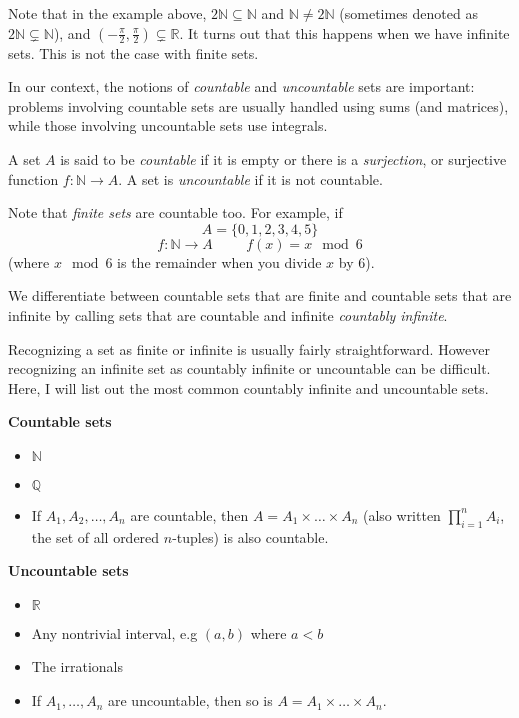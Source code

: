 \begin{appendices}
    Note that in the example above, $2\mathbb{N} \subseteq \mathbb{N}$ and $\mathbb{N} \neq 2 \mathbb{N}$ (sometimes denoted as $2\mathbb{N} \varsubsetneq \mathbb{N}$), and $(-\frac{\pi}{2}, \frac{\pi}{2}) \varsubsetneq \mathbb{R}$. It turns out that this happens when we have infinite sets. This is not the case with finite sets.

    In our context, the notions of \textit{countable} and \textit{uncountable} sets are important: problems involving countable sets are usually handled using sums (and matrices), while those involving uncountable sets use integrals.

    \begin{defn}
        A set $A$ is said to be \textit{countable} if it is empty or there is a \textit{surjection}, or surjective function $f: \mathbb{N} \rightarrow A$. A set is \textit{uncountable} if it is not countable.
    \end{defn}
    Note that \textit{finite sets} are countable too. For example, if 
    \[
    A = \{0,1,2,3,4,5\}
    \]
    \[
    f: \mathbb{N} \rightarrow A
    \hspace{1cm}
    f(x) = x\mod6
    \]
    (where $x\mod6$ is the remainder when you divide $x$ by 6).
    
    We differentiate between countable sets that are finite and countable sets that are infinite by calling sets that are countable and infinite \textit{countably infinite}.

    Recognizing a set as finite or infinite is usually fairly straightforward. However recognizing an infinite set as countably infinite or uncountable can be difficult. Here, I will list out the most common countably infinite and uncountable sets.

    \textbf{Countable sets}
    \begin{itemize}
        \item $\mathbb{N}$
        \item $\mathbb{Q}$
        \item If $A_1, A_2, \ldots, A_n$ are countable, then $A=A_1 \times \ldots \times A_n$ (also written $\prod_{i=1}^n A_i$, the set of all ordered $n$-tuples) is also countable.
    \end{itemize}

    \textbf{Uncountable sets}
    \begin{itemize}
        \item $\mathbb{R}$
        \item Any nontrivial interval, e.g $(a,b)$ where $a < b$
        \item The irrationals
        \item If $A_1, \ldots, A_n$ are uncountable, then so is $A = A_1 \times \ldots \times A_n$.
    \end{itemize}


\end{appendices}
